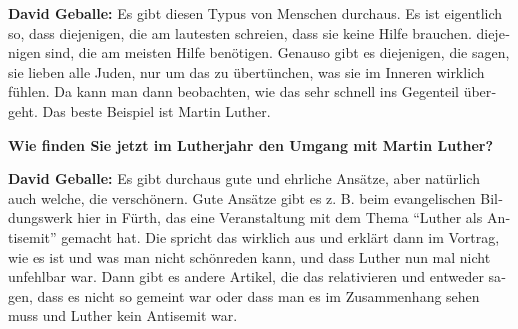 \begin{otherlanguage}{ngerman}
\textbf{David Geballe:} Es gibt diesen Typus von Menschen durchaus. Es ist eigentlich so, dass diejenigen, die am lautesten schreien, dass sie keine Hilfe brauchen. diejenigen sind, die am meisten Hilfe benötigen. Genauso gibt es diejenigen, die sagen, sie lieben alle Juden, nur um das zu übertünchen, was sie im Inneren wirklich fühlen. Da kann man dann beobachten, wie das sehr schnell ins Gegenteil übergeht. Das beste Beispiel ist Martin Luther. 

\textbf{Wie finden Sie jetzt im Lutherjahr den Umgang mit Martin Luther?} 

\textbf{David Geballe:} Es gibt durchaus gute und ehrliche Ansätze, aber natürlich auch welche, die verschönern. Gute Ansätze gibt es z. B. beim evangelischen Bildungswerk hier in Fürth, das eine Veranstaltung mit dem Thema "`Luther als Antisemit"' gemacht hat. Die spricht das wirklich aus und erklärt dann im Vortrag, wie es ist und was man nicht schönreden kann, und dass Luther nun mal nicht unfehlbar war. Dann gibt es andere Artikel, die das relativieren und entweder sagen, dass es nicht so gemeint war oder dass man es im Zusammenhang sehen muss und Luther kein Antisemit war. 





\end{otherlanguage}
